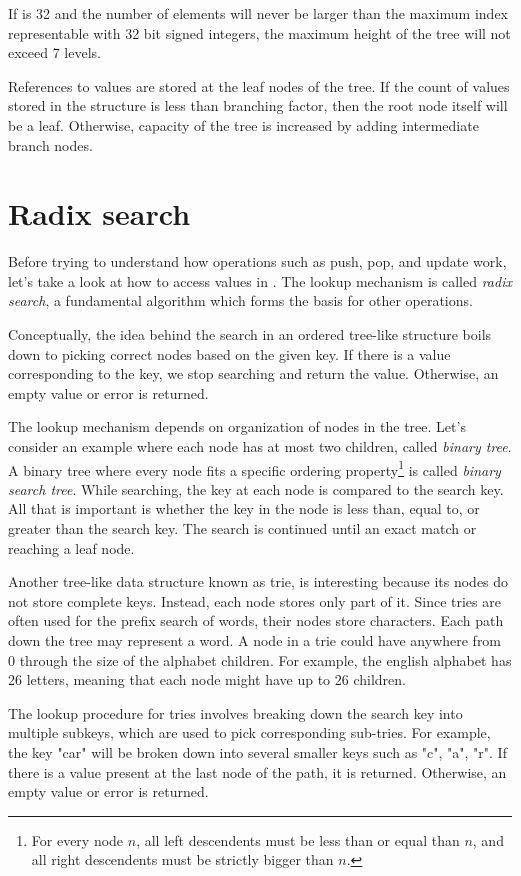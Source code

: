 If \m{} is 32 and the number of elements will never be larger than the maximum index representable with 32 bit signed integers, the maximum height of the tree will not exceed 7 levels. 

References to values are stored at the leaf nodes of the tree. If the count of values stored in the structure is less than branching factor, then the root node itself will be a leaf. Otherwise, capacity of the tree is increased by adding intermediate branch nodes. 

\section{Radix search}

Before trying to understand how operations such as push, pop, and update work, let's take a look at how to access values in \rbtree{}. The lookup mechanism is called \emph{radix search}, a fundamental algorithm which forms the basis for other operations.

Conceptually, the idea behind the search in an ordered tree-like structure boils down to picking correct nodes based on the given key. If there is a value corresponding to the key, we stop searching and return the value. Otherwise, an empty value or error is returned.

The lookup mechanism depends on organization of nodes in the tree. Let's consider an example where each node has at most two children, called \emph{binary tree}. A binary tree where every node fits a specific ordering property\footnote{For every node $n$, all left descendents must be less than or equal than $n$, and all right descendents must be strictly bigger than $n$.} is called \emph{binary search tree}. While searching, the key at each node is compared to the search key. All that is important is whether the key in the node is less than, equal to, or greater than the search key. The search is continued until an exact match or reaching a leaf node.

Another tree-like data structure known as trie, is interesting because its nodes do not store complete keys. Instead, each node stores only part of it. Since tries are often used for the prefix search of words, their nodes store characters. Each path down the tree may represent a word. A node in a trie could have anywhere from 0 through the size of the alphabet children. For example, the english alphabet has 26 letters, meaning that each node might have up to 26 children.

The lookup procedure for tries involves breaking down the search key into multiple subkeys, which are used to pick corresponding sub-tries. For example, the key "car" will be broken down into several smaller keys such as "c", "a", "r". If there is a value present at the last node of the path, it is returned. Otherwise, an empty value or error is returned. 


